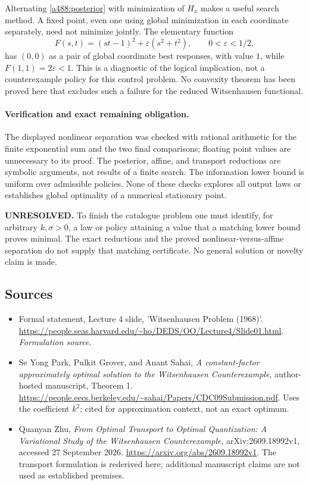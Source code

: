 \documentclass[11pt]{article}
\begin{document}
Alternating \eqref{a488:posterior} with minimization of $H_x$ makes a
useful search method. A fixed point, even one using global minimization
in each coordinate separately, need not minimize jointly. The elementary
function
\[
 F(s,t)=(st-1)^2+\varepsilon(s^2+t^2),\qquad0<\varepsilon<1/2,
\]
has $(0,0)$ as a pair of global coordinate best responses, with value
$1$, while $F(1,1)=2\varepsilon<1$. This is a diagnostic of the
logical implication, not a counterexample policy for this control problem.
No convexity theorem has been proved here that excludes such a failure
for the reduced Witsenhausen functional.

\paragraph{Verification and exact remaining obligation.}
The displayed nonlinear separation was checked with rational arithmetic
for the finite exponential sum and the two final comparisons; floating
point values are unnecessary to its proof. The posterior, affine, and
transport reductions are symbolic arguments, not results of a finite
search. The information lower bound is uniform over admissible policies.
None of these checks explores all output laws or establishes global
optimality of a numerical stationary point.

\textbf{UNRESOLVED.} To finish the catalogue problem one must identify,
for arbitrary $k,\sigma>0$, a law or policy attaining a value that a
matching lower bound proves minimal. The exact reductions and the proved
nonlinear-versus-affine separation do not supply that matching certificate.
No general solution or novelty claim is made.

\subsection{Sources}
\begin{itemize}
\item[S1]Formal statement, Lecture 4 slide, 'Witsenhausen Problem (1968)'.
\url{https://people.seas.harvard.edu/~ho/DEDS/OO/Lecture4/Slide01.html}.
\textit{Formulation source.}
\item[E1]Se Yong Park, Pulkit Grover, and Anant Sahai,
\textit{A constant-factor approximately optimal solution to the
Witsenhausen Counterexample}, author-hosted manuscript, Theorem 1.
\url{https://people.eecs.berkeley.edu/~sahai/Papers/CDC09Submission.pdf}.
Uses the coefficient $k^2$; cited for approximation context, not an exact optimum.
\item[E2]Quanyan Zhu, \textit{From Optimal Transport to Optimal
Quantization: A Variational Study of the Witsenhausen Counterexample},
arXiv:2609.18992v1, accessed 27 September 2026.
\url{https://arxiv.org/abs/2609.18992v1}.
The transport formulation is rederived here; additional manuscript claims
are not used as established premises.
\end{itemize}
\end{document}
